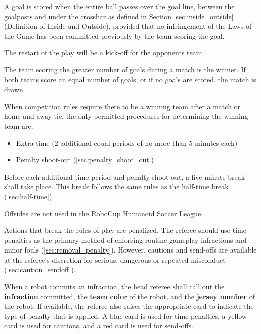 \label{sec:method_of_scoring}

\label{sec:goal_scored}
 
A goal is scored when the entire ball passes over the goal line, between the goalposts and under the crossbar as defined in Section \ref{sec:inside_outside} (Definition of Inside and Outside),    
provided that no infringement of the Laws of the Game has been committed previously by the team scoring the goal.

The restart of the play will be a kick-off for the opponents team.

\label{sec:winning_team}

The team scoring the greater number of goals during a match is the winner. 
If both teams score an equal number of goals, or if no goals are scored, the match is drawn.

\label{sec:permitted_tiebreakers}

When competition rules require there to be a winning team after a match or home-and-away tie, the only permitted procedures for determining the winning team are:
\begin{itemize}
\item Extra time (2 additional equal periods of no more than 5 minutes each)
\item Penalty shoot-out (\cf\cref{sec:penalty_shoot_out})
\end{itemize}

Before each additional time period and penalty shoot-out, a five-minute break shall take place.
This break follows the same rules as the half-time break (\cf\cref{sec:half-time}).


Offsides are not used in the RoboCup Humanoid Soccer League.

\label{sec:fouls_misconduct}

Actions that break the rules of play are penalized. The referee should use time penalties as the primary method of enforcing routine gameplay infractions and minor fouls (\cf\cref{sec:removal_penalty}). However, cautions and send-offs are available at the referee's discretion for serious, dangerous or repeated misconduct (\cf\cref{sec:caution_sendoff}).

When a robot commits an infraction, the head referee shall call out the \textbf{infraction} committed, the \textbf{team color} of the robot, and the \textbf{jersey number} of the robot. If available, the referee also raises the appropriate card to indicate the type of penalty that is applied. A blue card is used for time penalties, a yellow card is used for cautions, and a red card is used for send-offs.

